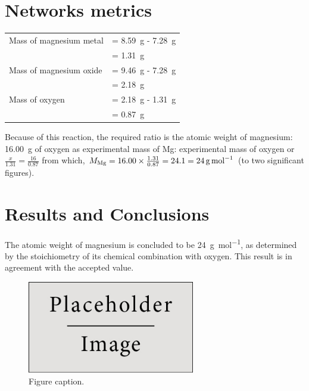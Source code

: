 \documentclass{article}
\begin{document}

\section{Networks metrics}

\begin{tabular}{ll}
Mass of magnesium metal & = \SI{8.59}{\gram} - \SI{7.28}{\gram}\\
& = \SI{1.31}{\gram}\\
Mass of magnesium oxide & = \SI{9.46}{\gram} - \SI{7.28}{\gram}\\
& = \SI{2.18}{\gram}\\
Mass of oxygen & = \SI{2.18}{\gram} - \SI{1.31}{\gram}\\
& = \SI{0.87}{\gram}
\end{tabular}

Because of this reaction, the required ratio is the atomic weight of magnesium: \SI{16.00}{\gram} of oxygen as experimental mass of Mg: experimental mass of oxygen or $\frac{x}{1.31}=\frac{16}{0.87}$ from which, $M_{\ce{Mg}} = 16.00 \times \frac{1.31}{0.87} = 24.1 = \SI{24}{\gram\per\mole}$ (to two significant figures).


\section{Results and Conclusions}

The atomic weight of magnesium is concluded to be \SI{24}{\gram\per\mol}, as determined by the stoichiometry of its chemical combination with oxygen. This result is in agreement with the accepted value.

\begin{figure}[h]
\begin{center}
\includegraphics[width=0.65\textwidth]{placeholder} %
\caption{Figure caption.}
\end{center}
\end{figure}
\end{document}
